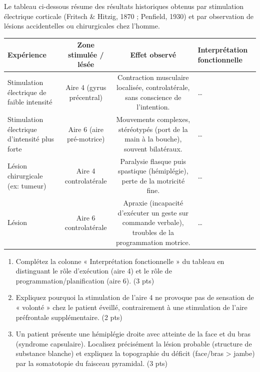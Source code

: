\documentclass[11pt]{article}
\begin{document}
\begin{exercice}
Le tableau ci-dessous résume des résultats historiques obtenus par stimulation électrique corticale (Fritsch \& Hitzig, 1870 ; Penfield, 1930) et par observation de lésions accidentelles ou chirurgicales chez l'homme.
\begin{center}
\begin{tabularx}{\linewidth}{|X|c|c|X|}
\hline
\textbf{Expérience} & \textbf{Zone stimulée / lésée} & \textbf{Effet observé} & \textbf{Interprétation fonctionnelle} \\
\hline
Stimulation électrique de faible intensité & Aire 4 (gyrus précentral) & Contraction musculaire localisée, controlatérale, sans conscience de l'intention. & \ldots \\
\hline
Stimulation électrique d'intensité plus forte & Aire 6 (aire pré-motrice) & Mouvements complexes, stéréotypés (port de la main à la bouche), souvent bilatéraux. & \ldots \\
\hline
Lésion chirurgicale (ex: tumeur) & Aire 4 controlatérale & Paralysie flasque puis spastique (hémiplégie), perte de la motricité fine. & \ldots \\
\hline
Lésion & Aire 6 controlatérale & Apraxie (incapacité d'exécuter un geste sur commande verbale), troubles de la programmation motrice. & \ldots \\
\hline
\end{tabularx}
\end{center}
\begin{enumerate}
    \item Complétez la colonne « Interprétation fonctionnelle » du tableau en distinguant le rôle d'exécution (aire 4) et le rôle de programmation/planification (aire 6). (3 pts)
    \item Expliquez pourquoi la stimulation de l'aire 4 ne provoque pas de sensation de « volonté » chez le patient éveillé, contrairement à une stimulation de l'aire préfrontale supplémentaire. (2 pts)
    \item Un patient présente une hémiplégie droite avec atteinte de la face et du bras (syndrome capsulaire). Localisez précisément la lésion probable (structure de substance blanche) et expliquez la topographie du déficit (face/bras > jambe) par la somatotopie du faisceau pyramidal. (3 pts)
\end{enumerate}
\end{exercice}
\end{document}
